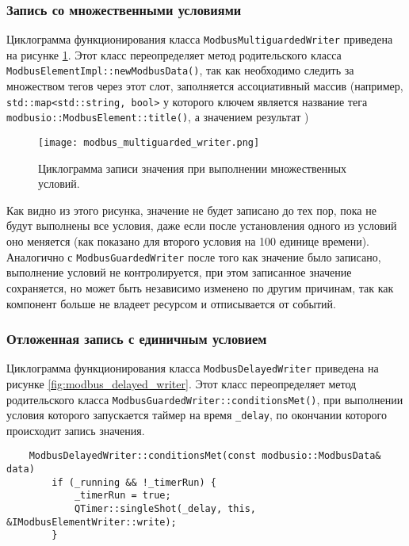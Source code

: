 \subsubsection{Запись со множественными условиями}
Циклограмма функционирования класса \texttt{ModbusMultiguardedWriter} приведена на рисунке \ref{fig:modbus_multiguarded_writed}.
Этот класс переопределяет метод родительского класса \texttt{ModbusElementImpl::newModbusData()},
так как необходимо следить за множеством тегов через этот слот,
заполняется ассоциативный массив (например, \texttt{std::map<std::string, bool>} у которого ключем является
название тега \texttt{modbusio::ModbusElement::title()}, а значением результат )
\begin{center}
    \begin{figure}[h!]
        \texttt{[image: modbus\_multiguarded\_writer.png]}
        \caption{Циклограмма записи значения при выполнении множественных условий.}\label{fig:modbus_multiguarded_writed}
    \end{figure}
\end{center}
Как видно из этого рисунка, значение не будет записано до тех пор, пока не будут
выполнены все условия, даже если после установления одного из условий оно меняется
(как показано для второго условия на 100 единице времени). Аналогично с \texttt{ModbusGuardedWriter}
после того как значение было записано, выполнение условий не контролируется, 
при этом записанное значение сохраняется, но может быть независимо изменено по другим причинам,
так как компонент больше не владеет ресурсом и отписывается от событий.


\subsubsection{Отложенная запись с единичным условием}
Циклограмма функционирования класса \texttt{ModbusDelayedWriter} приведена на рисунке \ref{fig:modbus_delayed_writer}.
Этот класс переопределяет метод родительского класса \texttt{ModbusGuardedWriter::conditionsMet()},
при выполнении условия которого запускается таймер на время \texttt{\_delay},
по окончании которого происходит запись значения.
\begin{lstlisting}
    ModbusDelayedWriter::conditionsMet(const modbusio::ModbusData& data)
        if (_running && !_timerRun) {
            _timerRun = true;
            QTimer::singleShot(_delay, this, &IModbusElementWriter::write);
        }
\end{lstlisting}

